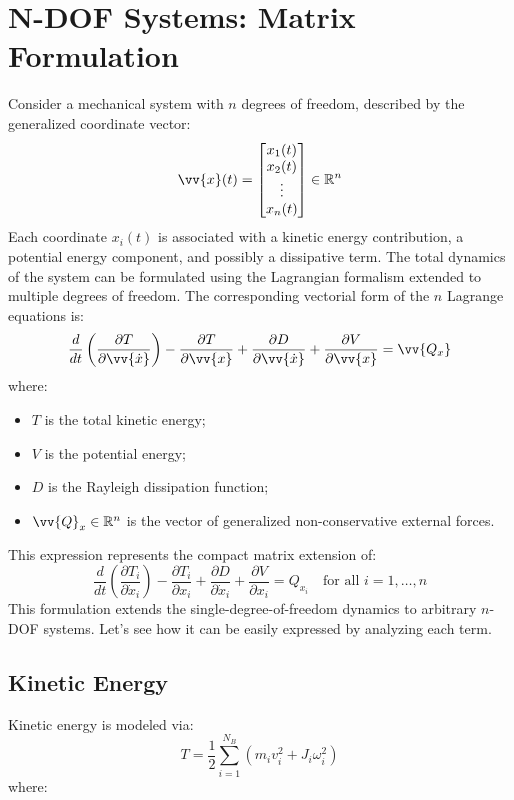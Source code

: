 
\chapter{N-DOF Systems: Matrix Formulation}

Consider a mechanical system with \( n \) degrees of freedom, described by the generalized coordinate vector:
\[
\vv{x}(t) =
\begin{bmatrix}
x_1(t) \\
x_2(t) \\
\vdots \\
x_n(t)
\end{bmatrix}
\in \mathbb{R}^n
\]
Each coordinate \( x_i(t) \) is associated with a kinetic energy contribution, a potential energy component, and possibly a dissipative term. The total dynamics of the system can be formulated using the Lagrangian formalism extended to multiple degrees of freedom. The corresponding vectorial form of the \( n \) Lagrange equations is:
\[
\frac{d}{dt} \left( \frac{\partial T}{\partial \vv{\dot{x}}} \right) - \frac{\partial T}{\partial \vv{x}} 
+ \frac{\partial D}{\partial \vv{\dot{x}}}
+ \frac{\partial V}{\partial \vv{x}} = \vv{Q_x}
\]
where:

\begin{itemize}
  \item \( T \) is the total kinetic energy;
  \item \( V \) is the potential energy;
  \item \( D \) is the Rayleigh dissipation function;
  \item \( \vv{Q}_x \in \mathbb{R}^n \) is the vector of generalized non-conservative external forces.
\end{itemize}

This expression represents the compact matrix extension of:
\[
\frac{d}{dt} \left( \frac{\partial T_i}{\partial \dot{x}_i} \right)
- \frac{\partial T_i}{\partial x_i}
+ \frac{\partial D}{\partial \dot{x}_i}
+ \frac{\partial V}{\partial x_i}
= Q_{x_i} \quad \text{for all } i = 1, \dots, n
\]
This formulation extends the single-degree-of-freedom dynamics to arbitrary \( n \)-DOF systems. Let's see how it can be easily expressed by analyzing each term.

\section{Kinetic Energy}

Kinetic energy is modeled via:
\[
T = \frac{1}{2} \sum_{i=1}^{N_B} \left( m_i v_i^2 + J_i \omega_i^2\right)
\]
where:

